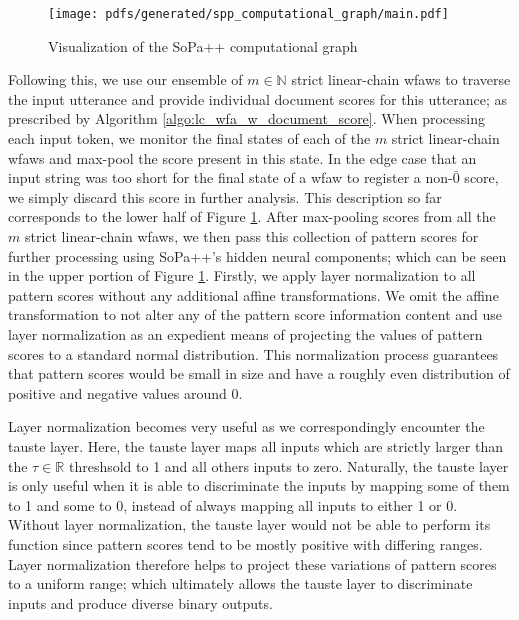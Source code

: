 \begin{figure}[t!]
  \centering
  \texttt{[image: pdfs/generated/spp\_computational\_graph/main.pdf]}
  \caption{Visualization of the SoPa++ computational graph}
  \label{fig:spp_cg}
\end{figure}

Following this, we use our ensemble of $m \in \mathbb{N}$ strict linear-chain
\ac{wfaws} to traverse the input utterance and provide individual document
scores for this utterance; as prescribed by Algorithm
\ref{algo:lc_wfa_w_document_score}. When processing each input token, we monitor
the final states of each of the $m$ strict linear-chain \ac{wfaws} and
max-pool the score present in this state. In the edge case that an input string
was too short for the final state of a \ac{wfaw} to register a non-$\bar{0}$
score, we simply discard this score in further analysis. This description so far
corresponds to the lower half of Figure \ref{fig:spp_cg}. After max-pooling
scores from all the $m$ strict linear-chain \ac{wfaws}, we then pass this
collection of pattern scores for further processing using SoPa++'s hidden neural
components; which can be seen in the upper portion of Figure \ref{fig:spp_cg}.
Firstly, we apply layer normalization \citep{ba2016layer} to all pattern scores
without any additional affine transformations. We omit the affine transformation
to not alter any of the pattern score information content and use layer
normalization as an expedient means of projecting the values of pattern scores
to a standard normal distribution. This normalization process guarantees that
pattern scores would be small in size and have a roughly even distribution of
positive and negative values around 0.

Layer normalization becomes very useful as we correspondingly encounter the
\ac{tauste} layer. Here, the \ac{tauste} layer maps all inputs which are strictly larger
than the $\tau \in \mathbb{R}$ threshsold to 1 and all others inputs to zero.
Naturally, the \ac{tauste} layer is only useful when it is able to discriminate the
inputs by mapping some of them to 1 and some to 0, instead of always mapping all
inputs to either 1 or 0. Without layer normalization, the \ac{tauste} layer would not
be able to perform its function since pattern scores tend to be mostly positive
with differing ranges. Layer normalization therefore helps to project these
variations of pattern scores to a uniform range; which ultimately allows the \ac{tauste}
layer to discriminate inputs and produce diverse binary outputs.

